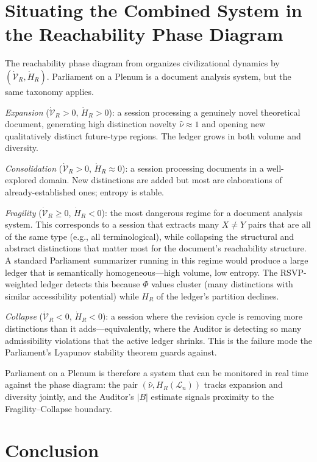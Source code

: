 \documentclass[12pt, a4paper]{article}
\theoremstyle{plain}
\theoremstyle{definition}
\theoremstyle{remark}
\begin{document}
\section{Situating the Combined System in the Reachability Phase Diagram}
\label{sec:phase}

The reachability phase diagram from \cite{flyxionreachability} organizes civilizational dynamics by $(\dot{\mathcal{V}}_R, \dot{H}_R)$. Parliament on a Plenum is a document analysis system, but the same taxonomy applies.

\textit{Expansion} ($\dot{\mathcal{V}}_R > 0$, $\dot{H}_R > 0$): a session processing a genuinely novel theoretical document, generating high distinction novelty $\hat{\nu} \approx 1$ and opening new qualitatively distinct future-type regions. The ledger grows in both volume and diversity.

\textit{Consolidation} ($\dot{\mathcal{V}}_R > 0$, $\dot{H}_R \approx 0$): a session processing documents in a well-explored domain. New distinctions are added but most are elaborations of already-established ones; entropy is stable.

\textit{Fragility} ($\dot{\mathcal{V}}_R \geq 0$, $\dot{H}_R < 0$): the most dangerous regime for a document analysis system. This corresponds to a session that extracts many $X \neq Y$ pairs that are all of the same type (e.g., all terminological), while collapsing the structural and abstract distinctions that matter most for the document's reachability structure. A standard Parliament summarizer running in this regime would produce a large ledger that is semantically homogeneous---high volume, low entropy. The RSVP-weighted ledger detects this because $\Phi$ values cluster (many distinctions with similar accessibility potential) while $H_R$ of the ledger's partition declines.

\textit{Collapse} ($\dot{\mathcal{V}}_R < 0$, $\dot{H}_R < 0$): a session where the revision cycle is removing more distinctions than it adds---equivalently, where the Auditor is detecting so many admissibility violations that the active ledger shrinks. This is the failure mode the Parliament's Lyapunov stability theorem guards against.

Parliament on a Plenum is therefore a system that can be monitored in real time against the phase diagram: the pair $(\hat{\nu}, H_R(\mathcal{L}_n))$ tracks expansion and diversity jointly, and the Auditor's $|B|$ estimate signals proximity to the Fragility--Collapse boundary.

\section{Conclusion}
\label{sec:conclusion}
\end{document}
